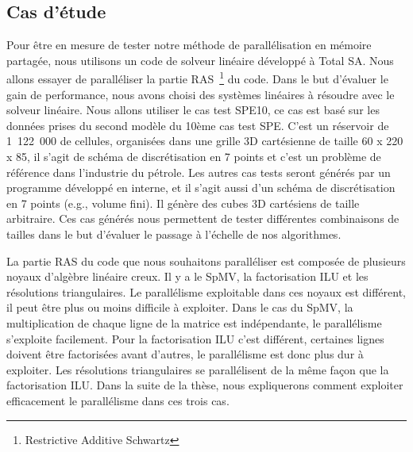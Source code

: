 \subsection{Cas d'étude}
Pour être en mesure de tester notre méthode de parallélisation en mémoire partagée, nous utilisons un code de solveur linéaire développé à Total SA.
%
Nous allons essayer de paralléliser la partie RAS~\footnote{Restrictive Additive Schwartz} du code.
%
Dans le but d'évaluer le gain de performance, nous avons choisi des systèmes linéaires à résoudre avec le solveur linéaire.
%
Nous allons utiliser le cas test SPE10, ce cas est basé sur les données prises du second modèle du 10ème cas test SPE\cite{SPE10}.
%
C'est un réservoir de 1~122~000 de cellules, organisées dans une grille 3D cartésienne de taille 60 x 220 x 85, il s'agit de schéma de discrétisation en 7 points et c'est un problème de référence dans l'industrie du pétrole.
%
Les autres cas tests seront générés par un programme développé en interne, et il s'agit aussi d'un schéma de discrétisation en 7 points (e.g., volume fini).
%
Il génère des cubes 3D cartésiens de taille arbitraire.
%
Ces cas générés nous permettent de tester différentes combinaisons de tailles dans le but d'évaluer le passage à l'échelle de nos algorithmes.


La partie RAS du code que nous souhaitons paralléliser est composée de plusieurs noyaux d'algèbre linéaire creux.
%
Il y a le SpMV, la factorisation ILU et les résolutions triangulaires.
%
Le parallélisme exploitable dans ces noyaux est différent, il peut être plus ou moins difficile à exploiter.
%
Dans le cas du SpMV, la multiplication de chaque ligne de la matrice est indépendante, le parallélisme s'exploite facilement.
%
Pour la factorisation ILU c'est différent, certaines lignes doivent être factorisées avant d'autres, le parallélisme est donc plus dur à exploiter.
%
Les résolutions triangulaires se parallélisent de la même façon que la factorisation ILU.
%
Dans la suite de la thèse, nous expliquerons comment exploiter efficacement le parallélisme dans ces trois cas.
